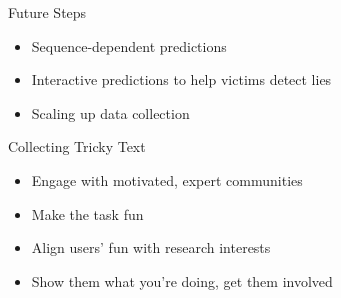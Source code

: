 \documentclass[xcolor=dvipsnames]{beamer}
\begin{document}



\begin{frame}{Future Steps}

  \begin{itemize}
    \item Sequence-dependent predictions
    \item Interactive predictions to help victims detect lies
    \item Scaling up data collection
  \end{itemize}
\end{frame}


\begin{frame}{Collecting Tricky Text}

  \begin{itemize}
    \item Engage with motivated, expert communities
    \item Make the task fun
    \item Align users' fun with research interests
    \item Show them what you're doing, get them involved
  \end{itemize}

\end{frame}
\end{document}
